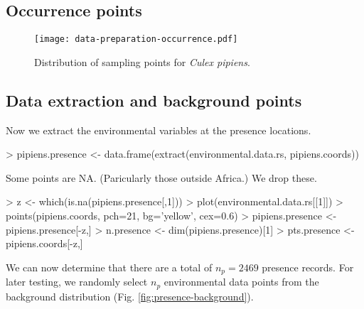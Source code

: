 \documentclass[10pt]{article}
\renewenvironment{Schunk}{\vspace{\topsep}}{\vspace{\topsep}}
\begin{document}
\subsection{Occurrence points}

\begin{Schunk}
\end{Schunk}

\begin{figure}
  \begin{center}
    \texttt{[image: data-preparation-occurrence.pdf]}
    \caption{Distribution of sampling points for \textit{Culex pipiens}.}  
    \label{fig:Cx-pipiens}
  \end{center}
\end{figure}

\subsection{Data extraction and background points}

Now we extract the environmental variables at the presence locations.

\begin{Schunk}
\begin{Sinput}
> pipiens.presence <- data.frame(extract(environmental.data.rs, pipiens.coords))
\end{Sinput}
\end{Schunk}

Some points are NA. (Paricularly those outside Africa.) We drop these.

\begin{Schunk}
\begin{Sinput}
> z <- which(is.na(pipiens.presence[,1]))
> plot(environmental.data.rs[[1]])
> points(pipiens.coords, pch=21, bg='yellow', cex=0.6)
> pipiens.presence <- pipiens.presence[-z,]
> n.presence <- dim(pipiens.presence)[1]
> pts.presence <- pipiens.coords[-z,]
\end{Sinput}
\end{Schunk}

We can now determine that there are a total of $n_p=2469$ presence records. For later testing, we randomly select $n_p$ environmental data points from the background distribution (Fig. \ref{fig:presence-background}).
\end{document}
